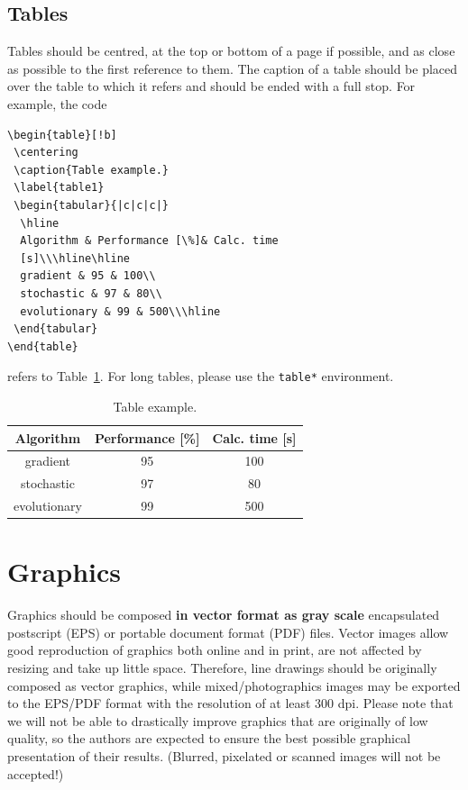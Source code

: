 \documentclass{amcs}
\begin{document}
\subsection{Tables}
%
Tables should be centred, at the top or bottom of a page if possible, and as close as possible to the first reference to them. The caption of a table should be placed over the table to which it refers and should be ended with a full stop. For example, the code
%
{\small\begin{verbatim}
\begin{table}[!b]
 \centering
 \caption{Table example.}
 \label{table1}
 \begin{tabular}{|c|c|c|}
  \hline
  Algorithm & Performance [\%]& Calc. time
  [s]\\\hline\hline
  gradient & 95 & 100\\
  stochastic & 97 & 80\\
  evolutionary & 99 & 500\\\hline
 \end{tabular}
\end{table}
\end{verbatim}}
\noindent refers to Table~\ref{table1}. For long tables, please use the \verb+table*+ environment.
%
\begin{table}[!b]
 \centering
 \caption{Table example.}
 \label{table1}
 \begin{tabular}{|c|c|c|}
   \hline
   Algorithm & Performance [\%]& Calc. time [s]\\\hline\hline
   gradient & 95 & 100\\
   stochastic & 97 & 80\\
   evolutionary & 99 & 500\\\hline
 \end{tabular}
\end{table}

\section{Graphics}
Graphics should be composed \textbf{in vector format as gray scale} encapsulated postscript (EPS) or portable document format (PDF) files. Vector images allow good reproduction of graphics both online and in print, are not affected by resizing and take up little space. Therefore, line drawings should be originally composed as vector graphics, while mixed/photographics images may be exported to the EPS/PDF format with the resolution of at least 300 dpi. Please note that we will not be able to drastically improve graphics that are originally of low quality, so the authors are expected to ensure the best possible graphical presentation of their results. (Blurred, pixelated or scanned images will not be accepted!)
\end{document}

